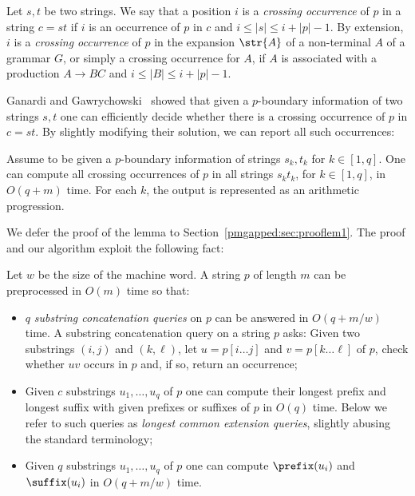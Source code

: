 \begin{definition}
Let $s,t$ be two strings. We say that a position $i$ is a \emph{crossing occurrence} of $p$ in a string $c=st$ if $i$ is an occurrence of $p$ in $c$ and $i \le |s| \le i+|p|-1$. By extension, $i$ is a \emph{crossing occurrence} of $p$ in the expansion $\str{A}$ of a non-terminal $A$ of a grammar $G$, or simply a crossing occurrence for $A$, if $A$ is associated with a production $A\rightarrow BC$ and $i \le |B| \le i+|p|-1$.
\end{definition}

Ganardi and Gawrychowski~\cite{DBLP:conf/soda/GanardiG22} showed that given a $p$-boundary information of two strings $s,t$ one can efficiently decide whether there is a crossing occurrence of $p$ in $c = st$. By slightly modifying their solution, we can report all such occurrences: 

\begin{lemma}
\label{lemma:crossing}
Assume to be given a $p$-boundary information of strings $s_k, t_k$ for $k \in [1,q]$. One can compute all crossing occurrences of $p$ in all strings $s_k t_k$, for $k\in[1,q]$, in $O(q+m)$ time. For each $k$, the output is represented as an arithmetic progression.
\end{lemma}

We defer the proof of the lemma to Section~\ref{pmgapped:sec:prooflem1}. The proof and our algorithm exploit the following fact:

\begin{fact}
\label{fact:substring_concat}
Let $w$ be the size of the machine word. A string $p$ of length $m$ can be preprocessed in $O(m)$ time so that:
\begin{itemize}
\item $q$ \emph{substring concatenation queries} on $p$ can be answered in $O(q+m/w)$ time. A substring concatenation query on a string $p$ asks: Given two substrings $(i,j)$ and $(k,\ell)$, let $u = p[i\dots j]$ and $v = p[k \dots \ell]$ of $p$, check whether $uv$ occurs in $p$ and, if so, return an occurrence; 
\item Given $c$ substrings $u_1,\ldots,u_q$ of $p$ one can compute their longest prefix and longest suffix with given prefixes or suffixes of $p$ in $O(q)$ time. Below we refer to such queries as \emph{longest common extension queries}, slightly abusing the standard terminology;
\item Given $q$ substrings $u_1,\ldots,u_q$ of $p$ one can compute $\prefix(u_i)$ and $\suffix(u_i)$ in $O(q+m/w)$ time.
\end{itemize}
\end{fact} 